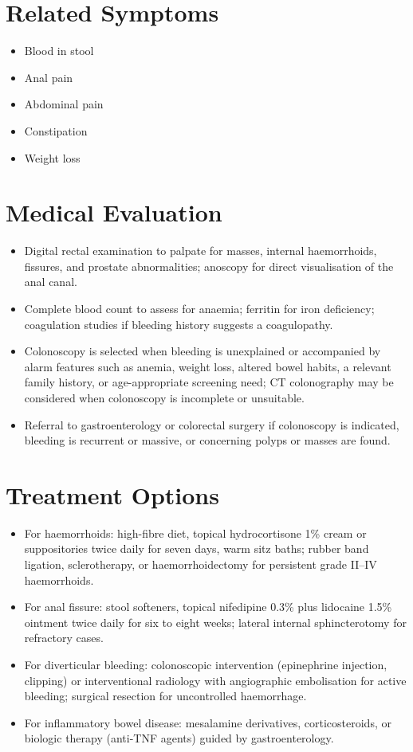 \section*{Related Symptoms}
\begin{itemize}
  \item Blood in stool
  \item Anal pain
  \item Abdominal pain
  \item Constipation
  \item Weight loss
\end{itemize}


\section*{Medical Evaluation}
\begin{itemize}
  \item Digital rectal examination to palpate for masses, internal haemorrhoids, fissures, and prostate abnormalities; anoscopy for direct visualisation of the anal canal.
  \item Complete blood count to assess for anaemia; ferritin for iron deficiency; coagulation studies if bleeding history suggests a coagulopathy.
  \item Colonoscopy is selected when bleeding is unexplained or accompanied by alarm features such as anemia, weight loss, altered bowel habits, a relevant family history, or age-appropriate screening need; CT colonography may be considered when colonoscopy is incomplete or unsuitable.
  \item Referral to gastroenterology or colorectal surgery if colonoscopy is indicated, bleeding is recurrent or massive, or concerning polyps or masses are found.
\end{itemize}

\section*{Treatment Options}
\begin{itemize}
  \item For haemorrhoids: high-fibre diet, topical hydrocortisone 1\% cream or suppositories twice daily for seven days, warm sitz baths; rubber band ligation, sclerotherapy, or haemorrhoidectomy for persistent grade II--IV haemorrhoids.
  \item For anal fissure: stool softeners, topical nifedipine 0.3\% plus lidocaine 1.5\% ointment twice daily for six to eight weeks; lateral internal sphincterotomy for refractory cases.
  \item For diverticular bleeding: colonoscopic intervention (epinephrine injection, clipping) or interventional radiology with angiographic embolisation for active bleeding; surgical resection for uncontrolled haemorrhage.
  \item For inflammatory bowel disease: mesalamine derivatives, corticosteroids, or biologic therapy (anti-TNF agents) guided by gastroenterology.
\end{itemize}

